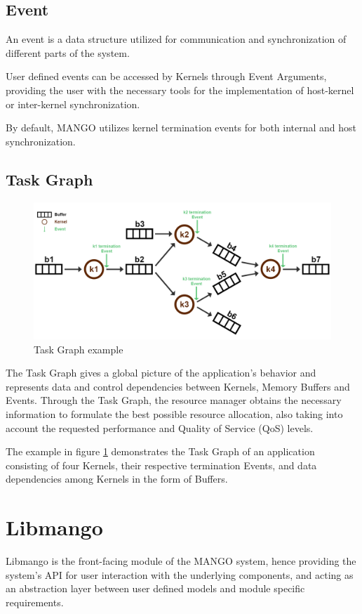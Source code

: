 \subsection{Event}

An event is a data structure utilized for communication and synchronization of different parts of the system.

User defined events can be accessed by Kernels through Event Arguments, providing the user with the necessary tools for the implementation of host-kernel or inter-kernel synchronization.

By default, MANGO utilizes kernel termination events for both internal and host synchronization.

\subsection{Task Graph} \label{arch:TaskGraph}

\begin{figure}[ht]
    \centering
    \includegraphics[width=\textwidth]{img/taskgraph.png}
    \captionsetup{justification=centering}
    \caption{Task Graph example}
    \label{fig:TaskGraph}
\end{figure}

The Task Graph gives a global picture of the application's behavior and represents data and control dependencies between Kernels, Memory Buffers and Events. 
Through the Task Graph, the resource manager obtains the necessary information to formulate the best possible resource allocation, also taking into account the requested performance and Quality of Service (QoS) levels.

The example in figure \ref{fig:TaskGraph} demonstrates the Task Graph of an application consisting of four Kernels, their respective termination Events, and data dependencies among Kernels in the form of Buffers.

\section{Libmango}
Libmango is the front-facing module of the MANGO system, hence providing the system's API for user interaction with the underlying components, and acting as an abstraction layer between user defined models and module specific requirements.

